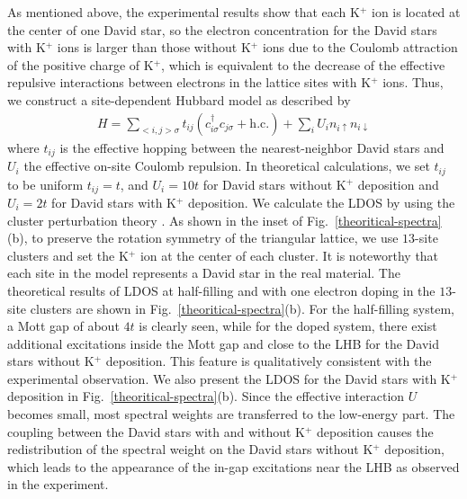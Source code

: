 \documentclass[aps,prl,reprint,groupedaddress,showpacs,amsfonts,amsmath,amssymb,superscriptaddress]{revtex4-1}
\begin{document}
As mentioned above, the experimental results show that each K$^{+}$ ion is located at the center of one David star, so the electron concentration for the David stars with K$^{+}$ ions is larger than those without K$^{+}$ ions due to the Coulomb attraction of the positive charge of K$^{+}$, which is equivalent to the decrease of the effective repulsive interactions between electrons in the lattice sites with K$^{+}$ ions. Thus, we construct a site-dependent Hubbard model as described by
\begin{align}\label{model-h}
H=\sum_{<i,j>\sigma}t_{ij}(c_{i\sigma}^{\dag}c_{j\sigma}+\mathrm{h.c.})+\sum_{i}U_{i}n_{i\uparrow}n_{i\downarrow}
\end{align}
where $t_{ij}$ is the effective hopping between the nearest-neighbor David stars and $U_{i}$ the effective on-site Coulomb repulsion.
In theoretical calculations, we set $t_{ij}$ to be uniform $t_{ij}=t$, and $U_{i}=10t$ for David stars without K$^{+}$ deposition and $U_{i}=2t$ for David stars with K$^{+}$ deposition. We calculate the LDOS by using the cluster perturbation theory \cite{PhysRevB.90.245102,PhysRevLett.84.522,SupMat}. As shown in the inset of Fig.~\ref{theoritical-spectra}(b), to preserve the rotation symmetry of the triangular lattice, we use $13$-site clusters and set the K$^{+}$ ion at the center of each cluster. It is noteworthy that each site in the model represents a David star in the real material. The theoretical results of LDOS at half-filling and with one electron doping in the $13$-site clusters are shown in Fig.~\ref{theoritical-spectra}(b). For the half-filling system, a Mott gap of about $4t$ is clearly seen, while for the doped system, there exist additional excitations inside the Mott gap and close to the LHB for the David stars without K$^{+}$ deposition. This feature is qualitatively consistent with the experimental observation. We also present the LDOS for the David stars with K$^{+}$ deposition in Fig.~\ref{theoritical-spectra}(b). Since the effective interaction $U$ becomes small, most spectral weights are transferred to the low-energy part. The coupling between the David stars with and without K$^{+}$ deposition causes the redistribution of the spectral weight on the David stars without K$^{+}$ deposition, which leads to the appearance of the in-gap excitations near the LHB as observed in the experiment.
\end{document}
